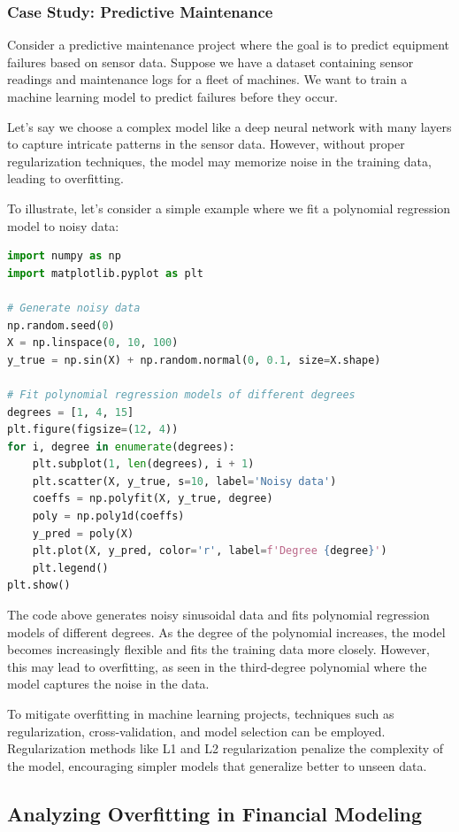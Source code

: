 \documentclass[12pt]{book} %
\begin{document}
\subsubsection{Case Study: Predictive Maintenance}

Consider a predictive maintenance project where the goal is to predict equipment failures based on sensor data. Suppose we have a dataset containing sensor readings and maintenance logs for a fleet of machines. We want to train a machine learning model to predict failures before they occur.

Let's say we choose a complex model like a deep neural network with many layers to capture intricate patterns in the sensor data. However, without proper regularization techniques, the model may memorize noise in the training data, leading to overfitting.

To illustrate, let's consider a simple example where we fit a polynomial regression model to noisy data:
\FloatBarrier
\begin{lstlisting}[language=Python]
import numpy as np
import matplotlib.pyplot as plt

# Generate noisy data
np.random.seed(0)
X = np.linspace(0, 10, 100)
y_true = np.sin(X) + np.random.normal(0, 0.1, size=X.shape)

# Fit polynomial regression models of different degrees
degrees = [1, 4, 15]
plt.figure(figsize=(12, 4))
for i, degree in enumerate(degrees):
    plt.subplot(1, len(degrees), i + 1)
    plt.scatter(X, y_true, s=10, label='Noisy data')
    coeffs = np.polyfit(X, y_true, degree)
    poly = np.poly1d(coeffs)
    y_pred = poly(X)
    plt.plot(X, y_pred, color='r', label=f'Degree {degree}')
    plt.legend()
plt.show()
\end{lstlisting}
\FloatBarrier
The code above generates noisy sinusoidal data and fits polynomial regression models of different degrees. As the degree of the polynomial increases, the model becomes increasingly flexible and fits the training data more closely. However, this may lead to overfitting, as seen in the third-degree polynomial where the model captures the noise in the data.

To mitigate overfitting in machine learning projects, techniques such as regularization, cross-validation, and model selection can be employed. Regularization methods like L1 and L2 regularization penalize the complexity of the model, encouraging simpler models that generalize better to unseen data.

\subsection{Analyzing Overfitting in Financial Modeling}
\end{document}
